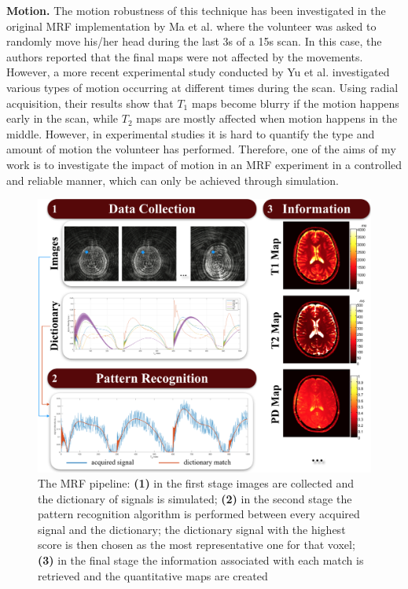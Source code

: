 \textbf{Motion.} The motion robustness of this technique has been investigated in the original MRF implementation by Ma et al. \cite{Ma2013} where the volunteer was asked to randomly move his/her head during the last 3s of a 15s scan.
In this case, the authors reported that the final maps were not affected by the movements.
However, a more recent experimental study conducted by Yu et al. \cite{Yu2017} investigated various types of motion occurring at different times during the scan.
Using radial acquisition, their results show that $T_1$ maps become blurry if the motion happens early in the scan, while $T_2$ maps are mostly affected when motion happens in the middle.
However, in experimental studies it is hard to quantify the type and amount of motion the volunteer has performed.
Therefore, one of the aims of my work is to investigate the impact of motion in an MRF experiment in a controlled and reliable manner, which can only be achieved through simulation.

\begin{figure}[ht]
    \centering
    \includegraphics[width=1\textwidth]{images/mri/mrfPipeline}
    \caption{The MRF pipeline: \textbf{(1)} in the first stage images are collected and the dictionary of signals is simulated; \textbf{(2)} in the second stage the pattern recognition algorithm is performed between every acquired signal and the dictionary; the dictionary signal with the highest score is then chosen as the most representative one for that voxel; \textbf{(3)} in the final stage the information associated with each match is retrieved and the quantitative maps are created}
    \label{fig:mrfPipeline}
\end{figure}


